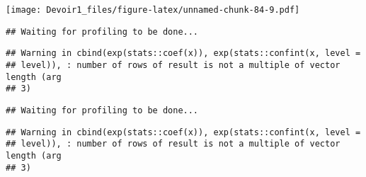 \documentclass[]{article}
\newenvironment{Shaded}{\begin{snugshade}}{\end{snugshade}}
\newcommand{\KeywordTok}[1]{\textcolor[rgb]{0.13,0.29,0.53}{\textbf{#1}}}
\newcommand{\DataTypeTok}[1]{\textcolor[rgb]{0.13,0.29,0.53}{#1}}
\newcommand{\DecValTok}[1]{\textcolor[rgb]{0.00,0.00,0.81}{#1}}
\newcommand{\StringTok}[1]{\textcolor[rgb]{0.31,0.60,0.02}{#1}}
\newcommand{\OperatorTok}[1]{\textcolor[rgb]{0.81,0.36,0.00}{\textbf{#1}}}
\newcommand{\NormalTok}[1]{#1}
\begin{document}
\texttt{[image: Devoir1\_files/figure-latex/unnamed-chunk-84-9.pdf]}

\begin{Shaded}
\end{Shaded}

\begin{verbatim}
## Waiting for profiling to be done...
\end{verbatim}

\begin{verbatim}
## Warning in cbind(exp(stats::coef(x)), exp(stats::confint(x, level =
## level)), : number of rows of result is not a multiple of vector length (arg
## 3)
\end{verbatim}

\begin{verbatim}
## Waiting for profiling to be done...
\end{verbatim}

\begin{verbatim}
## Warning in cbind(exp(stats::coef(x)), exp(stats::confint(x, level =
## level)), : number of rows of result is not a multiple of vector length (arg
## 3)
\end{verbatim}
\end{document}
